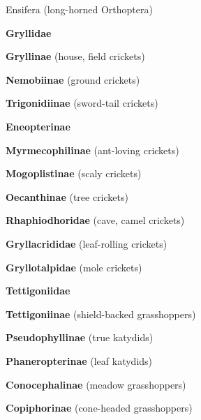 \documentclass[letterpaper,10pt]{article}
\begin{document}
{\makebox[0.20cm]{}  Ensifera (long-horned Orthoptera) \par
\makebox[0.6cm]{}  \textbf{Gryllidae} \par
\makebox[0.80cm]{}  \textbf{Gryllinae} (house, field crickets) \par
\makebox[0.80cm]{}  \textbf{Nemobiinae} (ground crickets) \par
\makebox[0.80cm]{}  \textbf{Trigonidiinae} (sword-tail crickets) \par
\makebox[0.80cm]{}  \textbf{Eneopterinae} \par
\makebox[0.80cm]{}  \textbf{Myrmecophilinae} (ant-loving crickets) \par
\makebox[0.80cm]{}  \textbf{Mogoplistinae} (scaly crickets) \par
\makebox[0.80cm]{}  \textbf{Oecanthinae} (tree crickets) \par
\makebox[0.6cm]{}  \textbf{Rhaphiodhoridae} (cave, camel crickets)	\par
\makebox[0.6cm]{}  \textbf{Gryllacrididae} (leaf-rolling crickets) \par
\makebox[0.6cm]{}  \textbf{Gryllotalpidae} (mole crickets) \par
\makebox[0.6cm]{}  \textbf{Tettigoniidae} \par
\makebox[0.80cm]{}  \textbf{Tettigoniinae} (shield-backed grasshoppers) \par
\makebox[0.80cm]{}  \textbf{Pseudophyllinae} (true katydids) \par
\makebox[0.80cm]{}  \textbf{Phaneropterinae} (leaf katydids) \par
\makebox[0.80cm]{}  \textbf{Conocephalinae} (meadow grasshoppers) \par
\makebox[0.80cm]{}  \textbf{Copiphorinae} (cone-headed grasshoppers) \par

}
\end{document}
